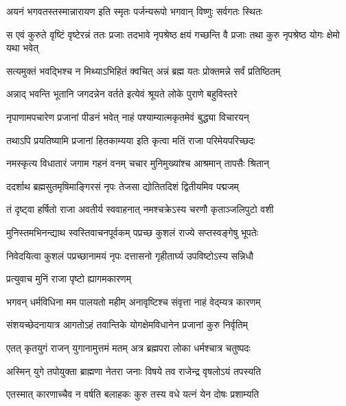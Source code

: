 \twolineshloka
{अयनं भगवतस्तस्मान्नारायण इति स्मृतः}
{पर्जन्यरूपो भगवान् विष्णुः सर्वगतः स्थितः}%

\threelineshloka
{स एवं कुरुते वृष्टिं वृष्टेरन्नं ततः प्रजाः}
{तदभावे नृपश्रेष्ठ क्षयं गच्छन्ति वै प्रजाः}
{तथा कुरु नृपश्रेष्ठ योगः क्षेमो यथा भवेत्}%


\twolineshloka
{सत्यमुक्तं भवद्भिश्च न मिथ्याऽभिहितं क्वचित्}
{अन्नं ब्रह्म यतः प्रोक्तमन्ने सर्वं प्रतिष्ठितम्}%

\twolineshloka
{अन्नाद् भवन्ति भूतानि जगदन्नेन वर्तते}
{इत्येवं श्रूयते लोके पुराणे बहुविस्तरे}%

\twolineshloka
{नृपाणामपचारेण प्रजानां पीडनं भवेत्}
{नाहं पश्याम्यात्मकृतमेवं बुद्ध्या विचारयन्}%

\twolineshloka
{तथाऽपि प्रयतिष्यामि प्रजानां हितकाम्यया}
{इति कृत्वा मतिं राजा परिमेयपरिच्छदः}%

\twolineshloka
{नमस्कृत्य विधातारं जगाम गहनं वनम्}
{चचार मुनिमुख्यांश्च आश्रमान् तापसैः श्रितान्}%

\twolineshloka
{ददर्शाथ ब्रह्मसुतमृषिमाङ्गिरसं नृपः}
{तेजसा द्योतितदिशं द्वितीयमिव पद्मजम्}%

\twolineshloka
{तं दृष्ट्वा हर्षितो राजा अवतीर्य स्ववाहनात्}
{नमश्चक्रेऽस्य चरणौ कृताञ्जलिपुटो वशी}%

\twolineshloka
{मुनिस्तमभिनन्द्याथ स्वस्तिवाचनपूर्वकम्}
{पप्रच्छ कुशलं राज्ये सप्तस्वङ्गेषु भूपतेः}%

\twolineshloka
{निवेदयित्वा कुशलं पप्रच्छानामयं नृपः}
{दत्तासनो गृहीतार्घ्य उपविष्टोऽस्य सन्निधौ}%

\onelineshloka
{प्रत्युवाच मुनिं राजा पृष्टो ह्यागमकारणम्}%


\twolineshloka
{भगवन् धर्मविधिना मम पालयतो महीम्}
{अनावृष्टिश्च संवृत्ता नाहं वेद्म्यत्र कारणम्}%

\twolineshloka
{संशयच्छेदनायात्र आगतोऽहं तवान्तिके}
{योगक्षेमविधानेन प्रजानां कुरु निर्वृतिम्}%


\twolineshloka
{एतत् कृतयुगं राजन् युगानामुत्तमं मतम्}
{अत्र ब्रह्मपरा लोका धर्मश्चात्र चतुष्पदः}%

\twolineshloka
{अस्मिन् युगे तपोयुक्ता ब्राह्मणा नेतरा जनाः}
{विषये तव राजेन्द्र वृषलोऽयं तपस्यति}%

\twolineshloka
{एतस्मात् कारणाच्चैव न वर्षति बलाहकः}
{कुरु तस्य वधे यत्नं येन दोषः प्रशाम्यति}%

